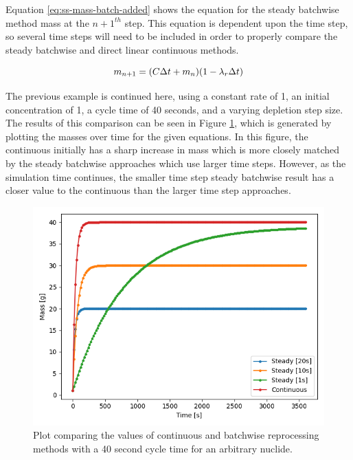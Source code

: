 Equation \eqref{eq:ss-mass-batch-added} shows the equation for the steady batchwise method mass at the $n+1^{th}$ step. This equation is dependent upon the time step, so several time steps will need to be included in order to properly compare the steady batchwise and direct linear continuous methods.

\begin{equation} \hfill
m_{n+1} = (C \Delta t + m_n) (1 - \lambda_r \Delta t)
\hfill\label{eq:ss-mass-batch-added} \end{equation}

The previous example is continued here, using a constant rate of 1, an initial concentration of 1, a cycle time of 40 seconds, and a varying depletion step size. The results of this comparison can be seen in Figure \ref{fig:steady_cont_repr_diff}, which is generated by plotting the masses over time for the given equations. In this figure, the continuous initially has a sharp increase in mass which is more closely matched by the steady batchwise approaches which use larger time steps. However, as the simulation time continues, the smaller time step steady batchwise result has a closer value to the continuous than the larger time step approaches.

\begin{figure}[H]
  \centering
  \includegraphics[scale=0.7]{images/dirlin-steady-comp.png}
  \caption{Plot comparing the values of continuous and batchwise reprocessing methods with a 40 second cycle time for an arbitrary nuclide.}
   \label{fig:steady_cont_repr_diff}
\end{figure}

